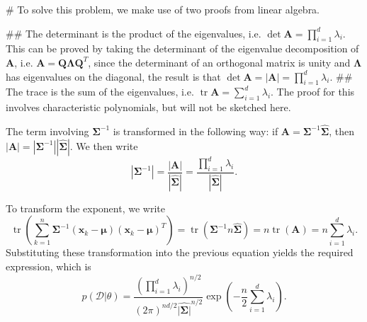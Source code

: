 \documentclass[12pt, a4paper]{article}
\newcommand{\D}{\mathcal{D}}
\newcommand{\vect}[1]{\bm{#1}}
\newcommand{\abs}[1]{\left\lvert#1\right\rvert}
\begin{document}
\begin{easylist}[enumerate]
# To solve this problem, we make use of two proofs from linear algebra.

\begin{easylist}

## The determinant is the product of the eigenvalues, i.e. $\det \vect{A} = \prod_{i=1}^{d} \lambda_i$.
This can be proved by taking the determinant of the eigenvalue decomposition of $\vect{A}$, i.e. $\vect{A}  = \vect{Q}  \vect{\Lambda} \vect{Q}^T$, since the determinant of an orthogonal matrix is unity and $\vect{\Lambda}$ has eigenvalues on the diagonal, the result is that $\det \vect{A} = \abs{\vect{A}} = \prod_{i=1}^{d} \lambda_i$.
## The trace is the sum of the eigenvalues, i.e. $\operatorname{tr} \vect{A} =\sum_{i=1}^{d} \lambda_i$. The proof for this involves characteristic polynomials, but will not be sketched here.
\end{easylist}

The term involving $\vect{\Sigma}^{-1}$ is transformed in the following way: if $\vect{A} = \vect{\Sigma}^{-1} \hat{\vect{\Sigma}}$, then $\abs{\vect{A}} = \abs{\vect{\Sigma}^{-1}} | \hat{\vect{\Sigma}} |$. We then write
\begin{equation*}
	\abs{\vect{\Sigma}^{-1}} = \frac{\abs{\vect{A}}}{| \hat{\vect{\Sigma}} |} = \frac{\prod_{i=1}^{d} \lambda_i}{| \hat{\vect{\Sigma}} |}.
\end{equation*}

To transform the exponent, we write
\begin{equation*}
	 \operatorname{tr} \left( \sum_{k=1}^{n}  \vect{\Sigma}^{-1} \left( \vect{x}_k - \vect{\mu} \right) \left( \vect{x}_k - \vect{\mu} \right)^T \right)
	 =
	 \operatorname{tr} \left( \vect{\Sigma}^{-1} n \hat{\vect{\Sigma}}  \right)
	 =
	 n  \operatorname{tr} \left( \vect{A} \right) = n \sum_{i=1}^{d} \lambda_i.
\end{equation*}
Substituting these transformation into the previous equation yields the required expression, which is
\begin{equation}
\label{eq:prob3_13}
	p(\D | \theta) = \frac{\left( \prod_{i=1}^{d} \lambda_i \right)^{n/2}}{\left(2 \pi \right)^{nd/2} \hat{\abs{\vect{\Sigma}}}^{n/2} } \exp \left( -\frac{n}{2} \sum_{i=1}^{d} \lambda_i \right).
\end{equation}


\end{easylist}
\end{document}
